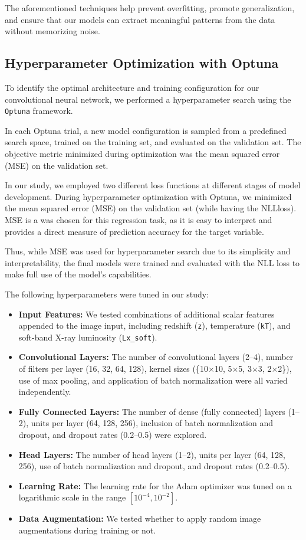 The aforementioned techniques help prevent overfitting, 
promote generalization, and ensure that our models can extract meaningful
patterns from the data without memorizing noise. 

\subsection{Hyperparameter Optimization with Optuna}

To identify the optimal architecture and training configuration for our 
convolutional neural network, we performed a hyperparameter 
search using the \texttt{Optuna} framework. 

In each Optuna trial, a new model configuration is sampled from a 
predefined search space, trained on the training set, and evaluated on 
the validation set. The objective metric minimized during optimization was 
the mean squared error (MSE) on the validation set.

In our study, we employed two different loss functions at 
different stages of model development. During hyperparameter 
optimization with Optuna, we minimized the mean squared error 
(MSE) on the validation set (while having the NLLloss). MSE is a 
was chosen for this regression 
task, as it is easy to interpret and provides a direct measure of 
prediction accuracy for the target variable. 

Thus, while MSE was used for hyperparameter search due to its 
simplicity and interpretability, the final models were trained 
and evaluated with the NLL loss to make full use of the model's 
capabilities.


The following hyperparameters were tuned in our study:

\begin{itemize}
    \item \textbf{Input Features:} We tested combinations of additional scalar features appended to the image input, including redshift (\texttt{z}), temperature (\texttt{kT}), and soft-band X-ray luminosity (\texttt{Lx\_soft}).
    \item \textbf{Convolutional Layers:} The number of convolutional layers (2--4), number of filters per layer (16, 32, 64, 128), kernel sizes (\{10$\times$10, 5$\times$5, 3$\times$3, 2$\times$2\}), use of max pooling, and application of batch normalization were all varied independently.
    \item \textbf{Fully Connected Layers:} The number of dense (fully connected) layers (1--2), units per layer (64, 128, 256), inclusion of batch normalization and dropout, and dropout rates (0.2--0.5) were explored.
    \item \textbf{Head Layers:} The number of head layers (1--2), units per layer (64, 128, 256), use of batch normalization and dropout, and dropout rates (0.2--0.5).
    \item \textbf{Learning Rate:} The learning rate for the Adam optimizer was tuned on a logarithmic scale in the range $[10^{-4}, 10^{-2}]$.
    \item \textbf{Data Augmentation:} We tested whether to apply random image augmentations during training or not.
\end{itemize}

